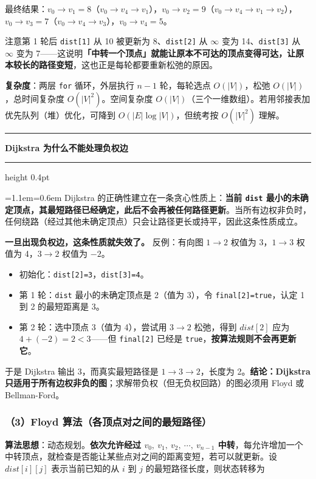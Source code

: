 \documentclass[11pt,openany,UTF8]{ctexbook}
\newcommand{\callouthead}[2]{%
  \par\addvspace{7pt}\noindent
  {\color{#1}\rule[-0.15em]{3pt}{1.05em}}\hspace{0.5em}%
  {\bfseries\color{#1}#2}\par\nobreak\vspace{-0.35em}%
  {\color{rulesep}\hrule height 0.4pt}\nobreak\vspace{0.45em}%
  \begingroup\small\setlength{\parindent}{0pt}%
  \leftskip=1.1em\rightskip=0.6em\noindent\ignorespaces}
\newcommand{\calloutend}{\par\endgroup\addvspace{7pt}}
\newenvironment{callwarn}[1]{\callouthead{warnbar}{#1}}{\calloutend}
\begin{document}
最终结果：$v_0\to v_1=8$（$v_0\to v_4\to v_1$），$v_0\to v_2=9$（$v_0\to v_4\to v_1\to v_2$），$v_0\to v_3=7$（$v_0\to v_4\to v_3$），$v_0\to v_4=5$。

注意第 1 轮后 \texttt{dist[1]\allowbreak{}} 从 10 被更新为 8、\texttt{dist[2]\allowbreak{}} 从 $\infty$ 变为 14、\texttt{dist[3]\allowbreak{}} 从 $\infty$ 变为 7——这说明\textbf{「中转一个顶点」就能让原本不可达的顶点变得可达，让原本较长的路径变短}，这也正是每轮都要重新松弛的原因。

\textbf{复杂度}：两层 \texttt{for} 循环，外层执行 $n-1$ 轮，每轮选点 $O(|V|)$，松弛 $O(|V|)$，总时间复杂度 $O(|V|^{2})$。空间复杂度 $O(|V|)$（三个一维数组）。若用邻接表加优先队列（堆）优化，可降到 $O(|E|\log|V|)$，但统考按 $O(|V|^{2})$ 理解。

\begin{callwarn}{Dijkstra 为什么不能处理负权边}
Dijkstra 的正确性建立在一条贪心性质上：\textbf{当前 \texttt{dist} 最小的未确定顶点，其最短路径已经确定，此后不会再被任何路径更新}。当所有边权非负时，任何绕路（经过其他未确定顶点）只会让路径更长或持平，因此这条性质成立。

\textbf{一旦出现负权边，这条性质就失效了。} 反例：有向图 $1\to 2$ 权值为 3，$1\to 3$ 权值为 4，$3\to 2$ 权值为 $-2$。

\begin{itemize}
\item 初始化：\texttt{dist[2]\allowbreak{}=\allowbreak{}3}，\texttt{dist[3]\allowbreak{}=\allowbreak{}4}。
\item 第 1 轮：\texttt{dist} 最小的未确定顶点是 2（值为 3），令 \texttt{final[2]\allowbreak{}=\allowbreak{}true}，认定 1 到 2 的最短距离是 3。
\item 第 2 轮：选中顶点 3（值为 4），尝试用 $3\to 2$ 松弛，得到 $dist[2]$ 应为 $4+(-2)=2<3$——但 \texttt{final[2]\allowbreak{}} 已经是 \texttt{true}，\textbf{按算法规则不会再更新它}。
\end{itemize}
于是 Dijkstra 输出 3，而真实最短路径是 $1\to 3\to 2$，长度为 2。\textbf{结论：Dijkstra 只适用于所有边权非负的图}；求解带负权（但无负权回路）的图必须用 Floyd 或 Bellman-Ford。

\end{callwarn}

\subsubsection{（3）Floyd 算法（各顶点对之间的最短路径）}

\textbf{算法思想}：动态规划。\textbf{依次允许经过 $v_0,\ v_1,\ v_2,\ \cdots,\ v_{n-1}$ 中转}，每允许增加一个中转顶点，就检查是否能让某些点对之间的距离变短，若可以就更新。设 $dist[i][j]$ 表示当前已知的从 $i$ 到 $j$ 的最短路径长度，则状态转移为
\end{document}
